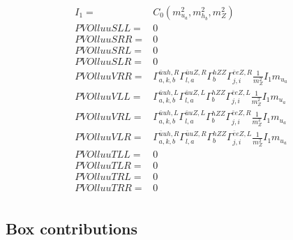 \documentclass[A4,landscape]{article}
\begin{document}
\begin{align} 
I_1= & C_0(m^2_{u_{{a}}}, m^2_{h_{{b}}}, m^2_{Z}) \\ 
  PVOlluuSLL= & 0 \\ 
  PVOlluuSRR= & 0 \\ 
  PVOlluuSRL= & 0 \\ 
  PVOlluuSLR= & 0 \\ 
  PVOlluuVRR= &  \Gamma^{\bar{u}u h ,R}_{a, k, b} \Gamma^{\bar{u}u Z ,R}_{l, a} \Gamma^{h Z Z }_{b} \Gamma^{\bar{e}e Z ,R}_{j, i} \frac{1}{m^2_{Z}} I_1 m_{u_{{a}}} \\ 
  PVOlluuVLL= &  \Gamma^{\bar{u}u h ,L}_{a, k, b} \Gamma^{\bar{u}u Z ,L}_{l, a} \Gamma^{h Z Z }_{b} \Gamma^{\bar{e}e Z ,L}_{j, i} \frac{1}{m^2_{Z}} I_1 m_{u_{{a}}} \\ 
  PVOlluuVRL= &  \Gamma^{\bar{u}u h ,L}_{a, k, b} \Gamma^{\bar{u}u Z ,L}_{l, a} \Gamma^{h Z Z }_{b} \Gamma^{\bar{e}e Z ,R}_{j, i} \frac{1}{m^2_{Z}} I_1 m_{u_{{a}}} \\ 
  PVOlluuVLR= &  \Gamma^{\bar{u}u h ,R}_{a, k, b} \Gamma^{\bar{u}u Z ,R}_{l, a} \Gamma^{h Z Z }_{b} \Gamma^{\bar{e}e Z ,L}_{j, i} \frac{1}{m^2_{Z}} I_1 m_{u_{{a}}} \\ 
  PVOlluuTLL= & 0 \\ 
  PVOlluuTLR= & 0 \\ 
  PVOlluuTRL= & 0 \\ 
  PVOlluuTRR= & 0 \\ 
\end{align} 
\subsection{Box contributions} 
\end{document}
